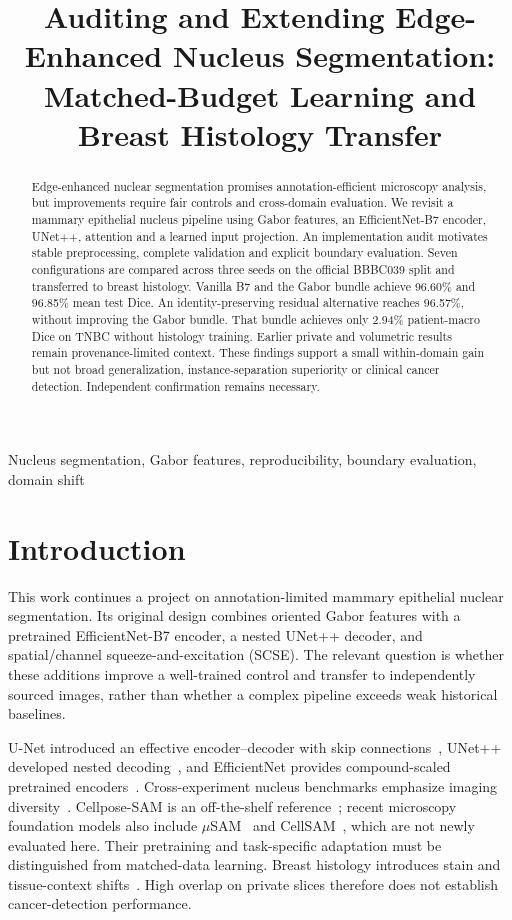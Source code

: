 \documentclass{article}
\title{Auditing and Extending Edge-Enhanced Nucleus Segmentation:\\Matched-Budget Learning and Breast Histology Transfer}
\begin{document}
\maketitle
\begin{abstract}
Edge-enhanced nuclear segmentation promises annotation-efficient microscopy analysis, but improvements require fair controls and cross-domain evaluation. We revisit a mammary epithelial nucleus pipeline using Gabor features, an EfficientNet-B7 encoder, UNet++, attention and a learned input projection. An implementation audit motivates stable preprocessing, complete validation and explicit boundary evaluation. Seven configurations are compared across three seeds on the official BBBC039 split and transferred to breast histology. Vanilla B7 and the Gabor bundle achieve 96.60\% and 96.85\% mean test Dice. An identity-preserving residual alternative reaches 96.57\%, without improving the Gabor bundle. That bundle achieves only 2.94\% patient-macro Dice on TNBC without histology training. Earlier private and volumetric results remain provenance-limited context. These findings support a small within-domain gain but not broad generalization, instance-separation superiority or clinical cancer detection. Independent confirmation remains necessary.
\end{abstract}
\begin{keywords}
Nucleus segmentation, Gabor features, reproducibility, boundary evaluation, domain shift
\end{keywords}

\section{Introduction}
\label{sec:intro}
This work continues a project on annotation-limited mammary epithelial nuclear segmentation. Its original design combines oriented Gabor features with a pretrained EfficientNet-B7 encoder, a nested UNet++ decoder, and spatial/channel squeeze-and-excitation (SCSE). The relevant question is whether these additions improve a well-trained control and transfer to independently sourced images, rather than whether a complex pipeline exceeds weak historical baselines.

U-Net introduced an effective encoder--decoder with skip connections~\cite{unet}, UNet++ developed nested decoding~\cite{unetpp}, and EfficientNet provides compound-scaled pretrained encoders~\cite{effnet}. Cross-experiment nucleus benchmarks emphasize imaging diversity~\cite{dsb}. Cellpose-SAM is an off-the-shelf reference~\cite{cpsam}; recent microscopy foundation models also include $\mu$SAM~\cite{microsam} and CellSAM~\cite{cellsam}, which are not newly evaluated here. Their pretraining and task-specific adaptation must be distinguished from matched-data learning. Breast histology introduces stain and tissue-context shifts~\cite{naylor}. High overlap on private slices therefore does not establish cancer-detection performance.
\end{document}
